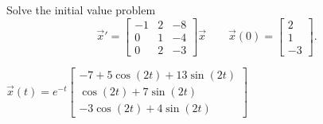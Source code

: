 \begin{exercise}
Solve the initial value problem
\[ {\vec{x}}' = \begin{bmatrix}-1 & 2 & -8 \\ 0 & 1 & -4 \\ 0 & 2 & -3 \end{bmatrix} \vec{x} \qquad \vec{x}(0) = \begin{bmatrix} 2 \\ 1 \\ -3 \end{bmatrix}. \]
\end{exercise}
\comboSol{%
}
{%
$\vec{x}(t) = e^{-t}\left[\begin{smallmatrix} -7 + 5\cos(2t) + 13\sin(2t) \\ \cos(2t) + 7\sin(2t) \\ -3\cos(2t) + 4\sin(2t) \end{smallmatrix}\right]$
}

\setcounter{exercise}{100}












